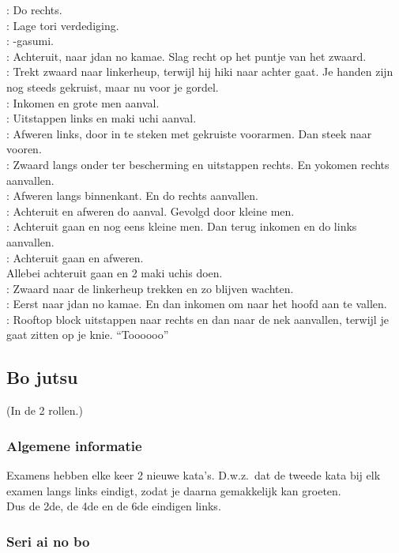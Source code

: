 \pB: Do rechts.\\
\pA: Lage tori verdediging.\\
\pB: -gasumi.\\
\pA: Achteruit, naar jdan no kamae. Slag recht op het puntje van het zwaard.\\
\pB: Trekt zwaard naar linkerheup, terwijl hij hiki naar achter gaat. Je handen zijn nog steeds gekruist, maar nu voor je gordel.\\
\pA: Inkomen en grote men aanval.\\
\pB: Uitstappen links en maki uchi aanval.\\
\pA: Afweren links, door in te steken met gekruiste voorarmen. Dan steek naar vooren.\\
\pB: Zwaard langs onder ter bescherming en uitstappen rechts. En yokomen rechts aanvallen.\\
\pA: Afweren langs binnenkant. En do rechts aanvallen.\\
\pB: Achteruit en afweren do aanval. Gevolgd door kleine men.\\
\pA: Achteruit gaan en nog eens kleine men. Dan terug inkomen en do links aanvallen.\\
\pB: Achteruit gaan en afweren.\\
Allebei achteruit gaan en 2 maki uchis doen.\\
\pA: Zwaard naar de linkerheup trekken en zo blijven wachten.\\
\pB: Eerst naar jdan no kamae. En dan inkomen om naar het hoofd aan te vallen.\\
\pA: Rooftop block uitstappen naar rechts en dan naar de nek aanvallen, terwijl je gaat zitten op je knie. ``Toooooo''

\subsection{Bo jutsu}
(In de 2 rollen.)

\subsubsection{Algemene informatie}

Examens hebben elke keer 2 nieuwe kata's. D.w.z.\ dat de tweede kata bij elk examen langs links eindigt, zodat je daarna gemakkelijk kan groeten.\\
Dus de 2de, de 4de en de 6de eindigen links.

\subsubsection{Seri ai no bo}

